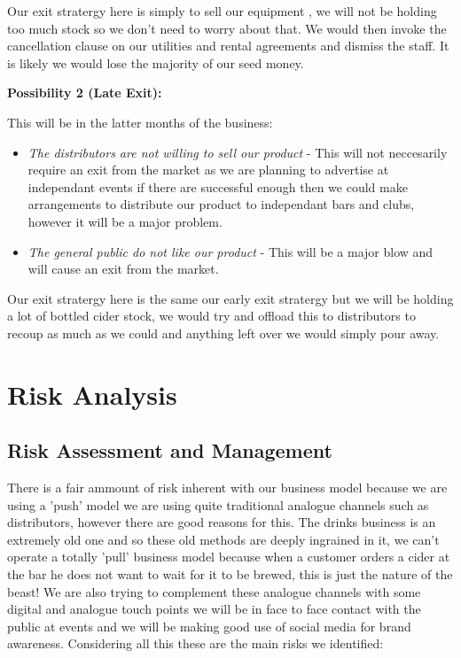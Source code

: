 \documentclass[11pt]{article}
\begin{document}
Our exit stratergy here is simply to sell our equipment , we will not be holding
too much stock so we don't need to worry about that. We would then invoke the
cancellation clause on our utilities and rental agreements and dismiss the
staff. It is likely we would lose the majority of our seed money.

\textbf{Possibility 2 (Late Exit):}

This will be in the latter months of the business:
  \begin{itemize}
	\item \emph{The distributors are not willing to sell our product} - This will
not neccesarily require an exit from the market as we are planning to advertise
at independant events if there are successful enough then we could make
arrangements to distribute our product to independant bars and clubs, however it
will be a major problem.
	\item \emph{The general public do not like our product} - This will be a major
blow and will cause an exit from the market.
  \end{itemize}

Our exit stratergy here is the same our early exit stratergy but we will be
holding a lot of bottled cider stock, we would try and offload this to
distributors to recoup as much as we could and anything left over we would
simply pour away.

\newpage


\section{Risk Analysis}

  \subsection{Risk Assessment and Management}
There is a fair ammount of risk inherent with our business model because we are
using a 'push' model we are using quite traditional analogue channels such as
distributors, however there are good reasons for this. The drinks business is an
extremely old one and so these old methods are deeply ingrained in it, we can't
operate a totally 'pull' business model because when a customer orders a cider
at the bar he does not want to wait for it to be brewed, this is just the nature
of the beast! We are also trying to complement these analogue channels with some
digital and analogue touch points we will be in face to face contact with the
public at events and we will be making good use of social media for brand
awareness. Considering all this these are the main risks we identified:
\end{document}
